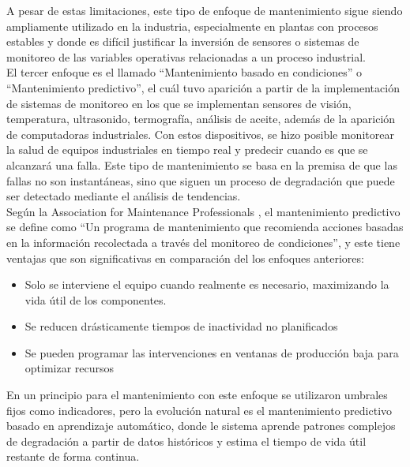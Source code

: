 A pesar de estas limitaciones, este tipo de enfoque de mantenimiento sigue siendo ampliamente utilizado en la industria, especialmente en plantas con procesos 
estables y donde es difícil justificar la inversión de sensores o sistemas de monitoreo de las variables operativas relacionadas a un proceso industrial.\\[.15cm]


El tercer enfoque es el llamado ``Mantenimiento basado en condiciones'' o ``Mantenimiento predictivo'', el cuál tuvo aparición a partir de la implementación de 
sistemas de monitoreo en los que se implementan sensores de visión, temperatura, ultrasonido, termografía, análisis de aceite, además de la aparición de 
computadoras industriales. Con estos dispositivos, se hizo posible monitorear la salud de equipos industriales en tiempo real y predecir cuando es que se 
alcanzará una falla. Este tipo de mantenimiento se basa en la premisa de que las fallas no son instantáneas, sino que siguen un proceso de degradación que 
puede ser detectado mediante el análisis de tendencias.\\[.15cm]

Según la  Association for Maintenance Professionals \cite{campbell2001}, el mantenimiento predictivo se define como ``Un programa de mantenimiento que recomienda 
acciones basadas en la información recolectada a través del monitoreo de condiciones'', y este tiene ventajas que son significativas en comparación del 
los enfoques anteriores:

\begin{itemize}
    \item Solo se interviene el equipo cuando realmente es necesario, maximizando la vida útil de los componentes.
    \item Se reducen drásticamente tiempos de inactividad no planificados
    \item Se pueden programar las intervenciones en ventanas de producción baja para optimizar recursos
\end{itemize}

En un principio para el mantenimiento con este enfoque se utilizaron umbrales fijos como indicadores, pero la evolución natural es el mantenimiento predictivo 
basado en aprendizaje automático, donde le sistema aprende patrones complejos de degradación a partir de datos históricos y estima el tiempo de vida útil 
restante de forma continua.\\[.15cm]

